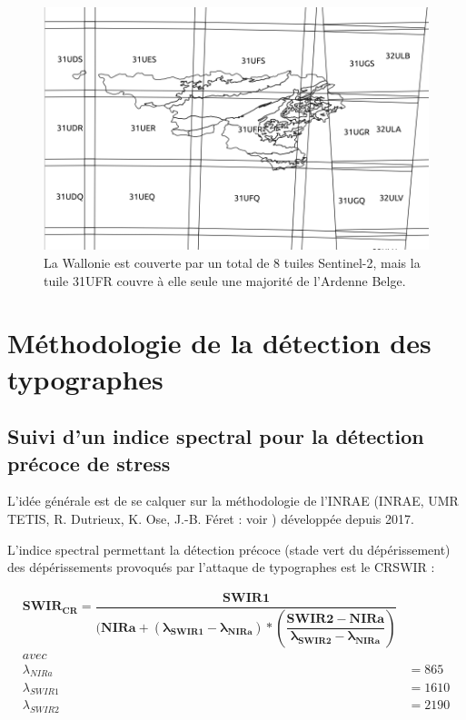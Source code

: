 \documentclass[a4paper, 12pt]{article} %
\begin{document}
\begin{figure}[H]
\centering
\includegraphics[width=0.9\linewidth]{../theia_d/tuileS2Nom.png}
\caption{La Wallonie est couverte par un total de 8 tuiles Sentinel-2, mais la tuile 31UFR couvre à elle seule une majorité de l'Ardenne Belge.}
\label{fig:tuileRW}
\end{figure}

\section{Méthodologie de la détection des typographes}

\subsection{Suivi d'un indice spectral pour la détection précoce de stress}\label{subsec:methodo}


L'idée générale est de se calquer sur la méthodologie de l'INRAE (INRAE, UMR TETIS, R. Dutrieux, K. Ose, J.-B. Féret : voir \citep{dutrieux_package_2021,dutrieux_mise_2021}) développée depuis 2017. 

L'indice spectral permettant la détection précoce (stade vert du dépérissement) des dépérissements provoqués par l'attaque de typographes est le CRSWIR :

\begin{align*} 
\mathbold{SWIR_{CR} = \dfrac{SWIR1}{( NIRa + (\lambda_{SWIR1}-\lambda_{NIRa})* (\dfrac{SWIR2 - NIRa}{\lambda_{SWIR2}-\lambda_{NIRa}})}} 
\\ 
avec&\\ 
\lambda_{NIRa} &=865\\ 
\lambda_{SWIR1} &=1610\\ 
\lambda_{SWIR2} &=2190
\end{align*} 
\end{document}
